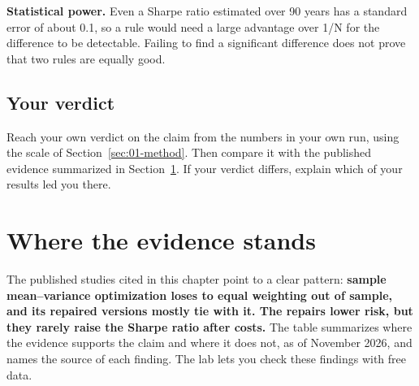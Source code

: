 \textbf{Statistical power.} Even a Sharpe ratio estimated over 90 years has a standard error of about 0.1, so a rule would need a large advantage over 1/N for the difference to be detectable. Failing to find a significant difference does not prove that two rules are equally good.

\subsection*{Your verdict}

Reach your own verdict on the claim from the numbers in your own run, using the scale of Section~\ref{sec:01-method}. Then compare it with the published evidence summarized in Section~\ref{sec:12-verdict}. If your verdict differs, explain which of your results led you there.

\section{Where the evidence stands}
\label{sec:12-verdict}

The published studies cited in this chapter point to a clear pattern: \textbf{sample mean--variance optimization loses to equal weighting out of sample, and its repaired versions mostly tie with it. The repairs lower risk, but they rarely raise the Sharpe ratio after costs.} The table summarizes where the evidence supports the claim and where it does not, as of November 2026, and names the source of each finding. The lab lets you check these findings with free data.

